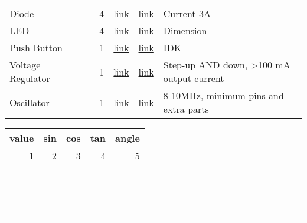 \documentclass[11pt]{article}
\begin{document}
\begin{center}
\begin{tabular}{llrrlll}
Diode &  &  & 4 & \href{https://www.digikey.com/product-detail/en/panasonic-electronic-components/DB2W40300L/DB2W40300LCT-ND/3884376}{link} & \href{https://industrial.panasonic.com/content/data/SC/ds/ds4/DB2W40300L\_E.pdf}{link} & Current 3A\\
LED &  &  & 4 & \href{https://www.digikey.com/product-detail/en/lite-on-inc/LTST-C191KFKT/160-1445-2-ND/386833}{link} & \href{http://optoelectronics.liteon.com/upload/download/DS22-2000-222/LTST-C191KFKT.pdf}{link} & Dimension\\
Push Button &  &  & 1 & \href{https://www.mouser.com/ProductDetail/E-Switch/LL3301NF065QG?qs=sGAEpiMZZMvxtGF7dlGNpqqmTFthXBmf0KM\%25252bqj1KR\%25252bA\%253d}{link} & \href{https://www.mouser.com/ds/2/140/P090002-267756.pdf}{link} & IDK\\
Voltage Regulator &  &  & 1 & \href{https://www.digikey.com/product-detail/en/microchip-technology/MCP1252-33X50I-MS/MCP1252-33X50I-MS-ND/529831}{link} & \href{http://ww1.microchip.com/downloads/en/DeviceDoc/20001752C.pdf}{link} & Step-up AND down, >100 mA output current\\
Oscillator &  &  & 1 & \href{https://www.digikey.com/product-detail/en/maxim-integrated/MAX7375AXR805-T/MAX7375AXR805-TCT-ND/4967873}{link} & \href{https://datasheets.maximintegrated.com/en/ds/MAX7375.pdf}{link} & 8-10MHz, minimum pins and extra parts\\
\end{tabular}
\end{center}



\begin{center}
\begin{tabular}{rrrrr}
value & sin & cos & tan & angle\\
\hline
1 & 2 & 3 & 4 & 5\\
 &  &  &  & \\
 &  &  &  & \\
 &  &  &  & \\
 &  &  &  & \\
 &  &  &  & \\
 &  &  &  & \\
 &  &  &  & \\
 &  &  &  & \\
 &  &  &  & \\
 &  &  &  & \\
 &  &  &  & \\
 &  &  &  & \\
 &  &  &  & \\
 &  &  &  & \\
 &  &  &  & \\
\end{tabular}
\end{center}
\end{document}
